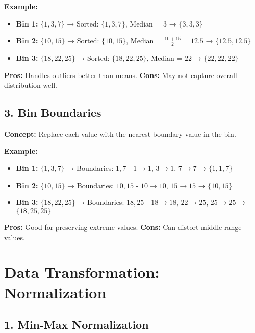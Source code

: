 \documentclass[a4paper,10pt]{article}
\begin{document}
\textbf{Example:}
\begin{itemize}
    \item \textbf{Bin 1:} \(\{1, 3, 7\}\) → Sorted: \(\{1, 3, 7\}\), Median = \(3\) → \(\{3, 3, 3\}\)
    \item \textbf{Bin 2:} \(\{10, 15\}\) → Sorted: \(\{10, 15\}\), Median = \(\frac{10 + 15}{2} = 12.5\) → \(\{12.5, 12.5\}\)
    \item \textbf{Bin 3:} \(\{18, 22, 25\}\) → Sorted: \(\{18, 22, 25\}\), Median = \(22\) → \(\{22, 22, 22\}\)
\end{itemize}

\textbf{Pros:} Handles outliers better than means.  
\textbf{Cons:} May not capture overall distribution well.

\vspace{0.5cm}

\subsection*{3. Bin Boundaries}
\textbf{Concept:}  
Replace each value with the nearest boundary value in the bin.

\textbf{Example:}
\begin{itemize}
    \item \textbf{Bin 1:} \(\{1, 3, 7\}\) → Boundaries: \(1, 7\)  
          - \(1 \to 1\), \(3 \to 1\), \(7 \to 7\) → \(\{1, 1, 7\}\)
    \item \textbf{Bin 2:} \(\{10, 15\}\) → Boundaries: \(10, 15\)  
          - \(10 \to 10\), \(15 \to 15\) → \(\{10, 15\}\)
    \item \textbf{Bin 3:} \(\{18, 22, 25\}\) → Boundaries: \(18, 25\)  
          - \(18 \to 18\), \(22 \to 25\), \(25 \to 25\) → \(\{18, 25, 25\}\)
\end{itemize}

\textbf{Pros:} Good for preserving extreme values.  
\textbf{Cons:} Can distort middle-range values.

\newpage %

\section*{\centering Data Transformation: Normalization}

\subsection*{1. Min-Max Normalization}
\end{document}
